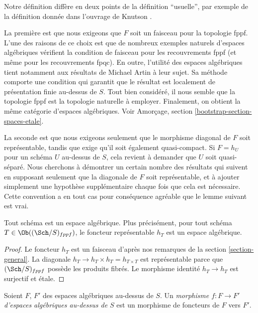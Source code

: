 \noindent
Notre définition diffère en deux points de la définition ``usuelle'', par exemple de la
définition donnée dans l'ouvrage de Knutson \cite{Kn}.

\medskip\noindent
La première est que nous exigeons que $F$ soit un faisceau pour la topologie fppf.
L'une des raisons de ce choix est que de nombreux exemples naturels
d'espaces algébriques vérifient la condition de faisceau pour les recouvrements fppf
(et même pour les recouvrements fpqc). En outre, l'utilité des espaces
algébriques tient notamment aux résultats de Michael Artin à leur sujet.
Sa méthode comporte une condition qui garantit que le résultat est
localement de présentation finie au-dessus de $S$.
Tout bien considéré, il nous semble que la topologie fppf
est la topologie naturelle à employer. Finalement, on obtient
la même catégorie d'espaces algébriques. Voir
Amorçage, section \ref{bootstrap-section-spaces-etale}.

\medskip\noindent
La seconde est que nous exigeons seulement que le morphisme diagonal de $F$ soit
représentable, tandis que \cite{Kn} exige qu'il soit également
quasi-compact. Si $F = h_U$ pour un schéma $U$ au-dessus de $S$,
cela revient à demander que $U$ soit quasi-séparé.
Nous cherchons à démontrer un certain
nombre des résultats qui suivent en supposant seulement que la diagonale
de $F$ soit représentable, et à ajouter simplement une hypothèse supplémentaire chaque fois que
cela est nécessaire. Cette convention a en tout cas pour conséquence agréable que
le lemme suivant est vrai.

\begin{lemma}
\label{lemma-scheme-is-space}
Tout schéma est un espace algébrique. Plus précisément,
pour tout schéma $T \in \Ob((\Sch/S)_{fppf})$,
le foncteur représentable $h_T$ est un espace algébrique.
\end{lemma}

\begin{proof}
Le foncteur $h_T$ est un faisceau d'après nos remarques de la section \ref{section-general}.
La diagonale $h_T \to h_T \times h_T = h_{T \times T}$ est
représentable parce que $(\Sch/S)_{fppf}$ possède les produits fibrés.
Le morphisme identité $h_T \to h_T$ est surjectif et \'etale.
\end{proof}

\begin{definition}
\label{definition-morphism-algebraic-spaces}
Soient $F$, $F'$ des espaces algébriques au-dessus de $S$.
Un {\it morphisme $f : F \to F'$ d'espaces algébriques au-dessus de $S$}
est un morphisme de foncteurs de $F$ vers $F'$.
\end{definition}


